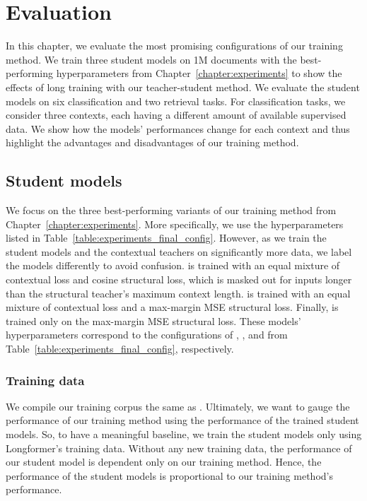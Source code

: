 \chapter{Evaluation}\label{chapter:evaluation}

In this chapter, we evaluate the most promising configurations of our training
method. We train three student models on 1M documents with the best-performing
hyperparameters from Chapter~\ref{chapter:experiments} to show the effects of
long training with our teacher-student method. We evaluate the student models
on six classification and two retrieval tasks. For classification tasks, we consider
three contexts, each having a different amount of available supervised data. We
show how the models' performances change for each context and thus
highlight the advantages and disadvantages of our training method.

\section{Student models}

We focus on the three best-performing variants of our training method from
Chapter~\ref{chapter:experiments}. More specifically, we use the hyperparameters
listed in Table~\ref{table:experiments_final_config}. However, as we train the
student models and the contextual teachers on significantly more data, we label
the models differently to avoid confusion. {\CosineStudent} is trained with an
equal mixture of contextual loss and cosine structural loss, which is masked
out for inputs longer than the structural teacher's maximum context length.
{\MSEStudent} is trained with an equal mixture of contextual loss and a
max-margin MSE structural loss. Finally, {\OnlyMSEStudent} is trained only on
the max-margin MSE structural loss. These models' hyperparameters correspond to
the configurations of ,
, and  from
Table~\ref{table:experiments_final_config}, respectively.

\subsection{Training data}

We compile our training corpus the same as . Ultimately, we
want to gauge the performance of our training method using the performance of
the trained student models. So, to have a meaningful baseline, we train the
student models only using Longformer's training data. Without any new training
data, the performance of our student model is dependent only on our training
method. Hence, the performance of the student models is proportional to our
training method's performance.

